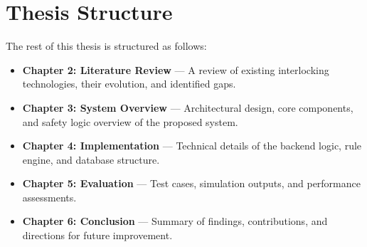 \section{Thesis Structure}
The rest of this thesis is structured as follows:
\begin{itemize}
    \item \textbf{Chapter 2: Literature Review} — A review of existing interlocking technologies, their evolution, and identified gaps.
    \item \textbf{Chapter 3: System Overview} — Architectural design, core components, and safety logic overview of the proposed system.
    \item \textbf{Chapter 4: Implementation} — Technical details of the backend logic, rule engine, and database structure.
    \item \textbf{Chapter 5: Evaluation} — Test cases, simulation outputs, and performance assessments.
    \item \textbf{Chapter 6: Conclusion} — Summary of findings, contributions, and directions for future improvement.
\end{itemize}